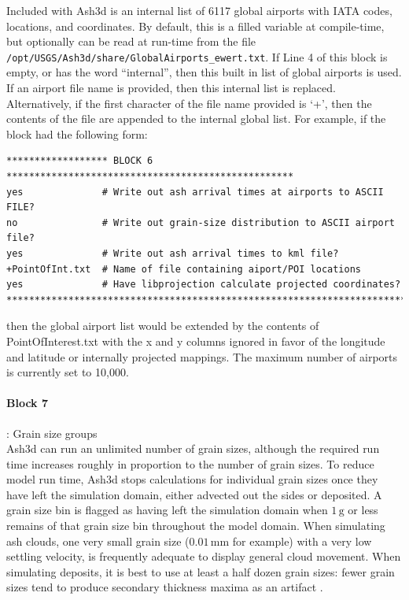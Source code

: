 Included with Ash3d is an internal list of 6117 global airports with IATA codes,
locations, and coordinates. By default, this is a filled variable at compile-time,
but optionally can be read at run-time from the
file \texttt{/opt/USGS/Ash3d/share/GlobalAirports\_ewert.txt}. If Line 4 of this
block is empty, or has the word ``internal'', then this built in list of global
airports is used. If an airport file name is provided, then this internal list
is replaced. Alternatively, if the first character of the file name provided is
`+', then the contents of the file are appended to the internal global list. For
example, if the block had the following form:
\small
\begin{verbatim}
****************** BLOCK 6 ***************************************************
yes              # Write out ash arrival times at airports to ASCII FILE?
no               # Write out grain-size distribution to ASCII airport file?
yes              # Write out ash arrival times to kml file?
+PointOfInt.txt  # Name of file containing aiport/POI locations
yes              # Have libprojection calculate projected coordinates?
*******************************************************************************
\end{verbatim}
\normalsize
then the global airport list would be extended by the contents of PointOfInterest.txt
with the x and y columns ignored in favor of the longitude and latitude or
internally projected mappings. The maximum number of airports is currently set
to 10,000.

\paragraph{Block 7}: Grain size groups\\
Ash3d can run an unlimited number of grain sizes, although the required run time
increases roughly in proportion to the number of grain sizes. To reduce model run
time, Ash3d stops calculations for individual grain sizes once they have left the
simulation domain, either advected out the sides or deposited. A grain size bin is
flagged as having left the simulation domain when $1 \, \mathrm{g}$ or less remains of
that grain size bin throughout the model domain.
When simulating ash clouds, one very small grain size ($0.01 \, \mathrm{mm}$ for
example) with a
very low settling velocity, is frequently adequate to display general cloud movement.
When simulating deposits, it is best to use at least a half dozen grain sizes: fewer
grain sizes tend to produce secondary thickness maxima as an artifact
\cite{Mastin2012}.

